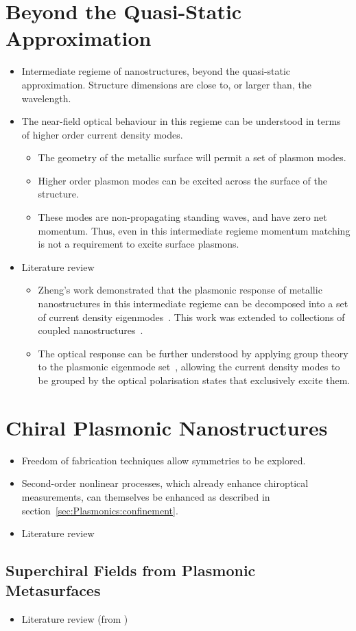 \section{Beyond the Quasi-Static Approximation}
\begin{itemize}
    \item Intermediate regieme of nanostructures, beyond the quasi-static approximation. Structure dimensions are close to, or larger than, the wavelength.
    \item The near-field optical behaviour in this regieme can be understood in terms of higher order current density modes.
    \begin{itemize}
        \item The geometry of the metallic surface will permit a set of plasmon modes.
        \item Higher order plasmon modes can be excited across the surface of the structure.
        \item These modes are non-propagating standing waves, and have zero net momentum. Thus, even in this intermediate regieme momentum matching is not a requirement to excite surface plasmons.
    \end{itemize}
    \item Literature review
    \begin{itemize}
        \item Zheng's work demonstrated that the plasmonic response of metallic nanostructures in this intermediate regieme can be decomposed into a set of current density eigenmodes~\cite{Zheng2012}. This work was extended to collections of coupled nanostructures~\cite{Zheng2013}. 
        \item The optical response can be further understood by applying group theory to the plasmonic eigenmode set~\cite{Zheng2015}, allowing the current density modes to be grouped by the optical polarisation states that exclusively excite them.
    \end{itemize}
\end{itemize}


\section{Chiral Plasmonic Nanostructures}
\begin{itemize}
    \item Freedom of fabrication techniques allow symmetries to be explored.
    \item Second-order nonlinear processes, which already enhance chiroptical measurements, can themselves be enhanced as described in section~\ref{sec:Plasmonics:confinement}.
    \item Literature review
\end{itemize}

\subsection{Superchiral Fields from Plasmonic Metasurfaces}
\begin{itemize}
    \item Literature review (from \cite{Collins2017})
\end{itemize}